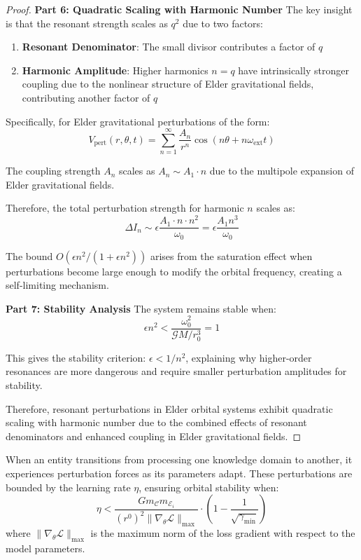 \begin{proof}
\textbf{Part 6: Quadratic Scaling with Harmonic Number}
The key insight is that the resonant strength scales as $q^2$ due to two factors:
\begin{enumerate}
    \item \textbf{Resonant Denominator}: The small divisor contributes a factor of $q$
    \item \textbf{Harmonic Amplitude}: Higher harmonics $n = q$ have intrinsically stronger coupling due to the nonlinear structure of Elder gravitational fields, contributing another factor of $q$
\end{enumerate}

Specifically, for Elder gravitational perturbations of the form:
\begin{equation}
V_{\text{pert}}(r, \theta, t) = \sum_{n=1}^{\infty} \frac{A_n}{r^n} \cos(n\theta + n\omega_{\text{ext}}t)
\end{equation}

The coupling strength $A_n$ scales as $A_n \sim A_1 \cdot n$ due to the multipole expansion of Elder gravitational fields.

Therefore, the total perturbation strength for harmonic $n$ scales as:
\begin{equation}
\Delta I_n \sim \epsilon \frac{A_1 \cdot n \cdot n^2}{\omega_0} = \epsilon \frac{A_1 n^3}{\omega_0}
\end{equation}

The bound $O(\epsilon n^2 / (1 + \epsilon n^2))$ arises from the saturation effect when perturbations become large enough to modify the orbital frequency, creating a self-limiting mechanism.

\textbf{Part 7: Stability Analysis}
The system remains stable when:
\begin{equation}
\epsilon n^2 < \frac{\omega_0^2}{\mathcal{G}M/r_0^3} = 1
\end{equation}

This gives the stability criterion: $\epsilon < 1/n^2$, explaining why higher-order resonances are more dangerous and require smaller perturbation amplitudes for stability.

Therefore, resonant perturbations in Elder orbital systems exhibit quadratic scaling with harmonic number due to the combined effects of resonant denominators and enhanced coupling in Elder gravitational fields.
\end{proof}

\begin{example}
When an entity transitions from processing one knowledge domain to another, it experiences perturbation forces as its parameters adapt. These perturbations are bounded by the learning rate $\eta$, ensuring orbital stability when:
\begin{equation}
\eta < \frac{G m_{\mathcal{C}} m_{\mathcal{E}_i}}{(r^0)^2 \|\nabla_{\theta} \mathcal{L}\|_{\max}} \cdot \left(1 - \frac{1}{\sqrt{\gamma_{\text{min}}}}\right)
\end{equation}
where $\|\nabla_{\theta} \mathcal{L}\|_{\max}$ is the maximum norm of the loss gradient with respect to the model parameters.
\end{example}

